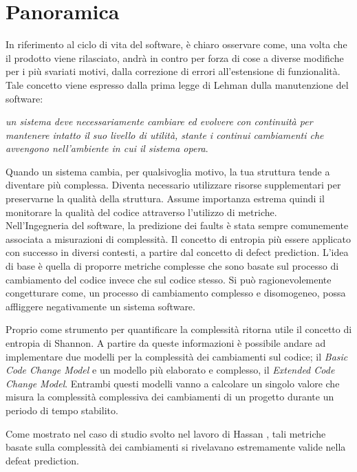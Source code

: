 \section{Panoramica}

In riferimento al ciclo di vita del software, è chiaro osservare come, una volta che il prodotto viene rilasciato, andrà in contro per forza di cose a diverse modifiche per i più svariati motivi, dalla correzione di errori all'estensione di funzionalità. Tale concetto viene espresso dalla prima legge di Lehman dulla manutenzione del software:
\begin{center}
\textit{un sistema deve necessariamente cambiare ed evolvere con continuità per mantenere intatto il suo livello di utilità, stante i continui cambiamenti che avvengono nell'ambiente in cui il sistema opera}.
\end{center}
Quando un sistema cambia, per qualsivoglia motivo, la tua struttura tende a diventare più complessa. Diventa necessario utilizzare risorse supplementari per preservarne la qualità della struttura. Assume importanza estrema quindi il monitorare la qualità del codice attraverso l'utilizzo di metriche.\\

Nell'Ingegneria del software, la predizione dei faults è stata sempre comunemente associata a misurazioni di complessità. Il concetto di entropia più essere applicato con successo in diversi contesti, a partire dal concetto di defect prediction. L'idea di base è quella di proporre metriche complesse che sono basate sul processo di cambiamento del codice invece che sul codice stesso. Si può ragionevolemente congetturare come, un processo di cambiamento  complesso e disomogeneo, possa affliggere negativamente un sistema software. 

Proprio come strumento per quantificare la complessità ritorna utile il concetto di entropia di Shannon. A partire da queste informazioni è possibile andare ad implementare due modelli per la complessità dei cambiamenti sul codice; il \textit{Basic Code Change Model} e un modello più elaborato e complesso, il \textit{Extended Code Change Model}. Entrambi questi modelli vanno a calcolare un singolo valore che misura la complessità complessiva dei cambiamenti di un progetto durante un periodo di tempo stabilito. 

Come mostrato nel caso di studio svolto nel lavoro di Hassan \cite{hassan2009predicting}, tali metriche basate sulla complessità dei cambiamenti si rivelavano estremamente valide nella defeat prediction.

